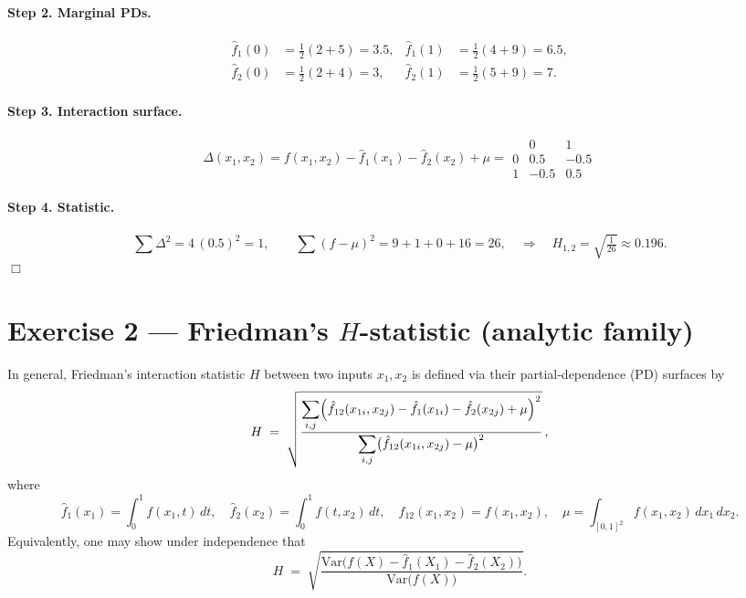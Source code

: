 \documentclass[a4paper]{article}
\begin{document}
\paragraph{Step 2.  Marginal PDs.}
\[
\begin{aligned}
\hat f_{1}(0)&=\tfrac12(2+5)=3.5,  &
\hat f_{1}(1)&=\tfrac12(4+9)=6.5, \\
\hat f_{2}(0)&=\tfrac12(2+4)=3,    &
\hat f_{2}(1)&=\tfrac12(5+9)=7 .
\end{aligned}
\]

\paragraph{Step 3.  Interaction surface.}
\[
\Delta(x_1,x_2)=f(x_1,x_2)-\hat f_{1}(x_1)-\hat f_{2}(x_2)+\mu
=\begin{array}{c|cc}
          & 0 & 1 \\ \hline
0 & 0.5 & -0.5 \\
1 & -0.5 & 0.5
\end{array}
\]

\paragraph{Step 4.  Statistic.}
\[
\sum\Delta^2 =4\,(0.5)^2=1,
\qquad
\sum(f-\mu)^2 = 9+1+0+16 = 26,
\quad\Longrightarrow\quad
H_{1,2}= \sqrt{\tfrac{1}{26}}\approx 0.196.
\]
\hfill$\Box$
\section*{Exercise 2 — Friedman's $H$-statistic (analytic family)}
\label{ex:H_param}

In general, Friedman's interaction statistic $H$ between two inputs $x_1,x_2$ is defined via their partial‐dependence (PD) surfaces by
\[
H \;=\;
\sqrt{\frac{\displaystyle
    \sum_{i,j}
      \Bigl(\hat f_{12}(x_{1i},x_{2j})
            -\hat f_{1}(x_{1i})
            -\hat f_{2}(x_{2j})
            +\mu\Bigr)^{2}
  }{\displaystyle
    \sum_{i,j}
      \bigl(\hat f_{12}(x_{1i},x_{2j})-\mu\bigr)^{2}
  }}\,,
\]
where
\[
\hat f_{1}(x_1)=\int_0^1 f(x_1,t)\,dt,\quad
\hat f_{2}(x_2)=\int_0^1 f(t,x_2)\,dt,\quad
\hat f_{12}(x_1,x_2)=f(x_1,x_2),\quad
\mu=\int_{[0,1]^2} f(x_1,x_2)\,dx_1\,dx_2.
\]
Equivalently, one may show under independence that
\[
H \;=\;
\sqrt{\frac{\text{Var}\bigl(f(X)-\hat f_1(X_1)-\hat f_2(X_2)\bigr)}
           {\text{Var}\bigl(f(X)\bigr)}}.
\]
\end{document}
